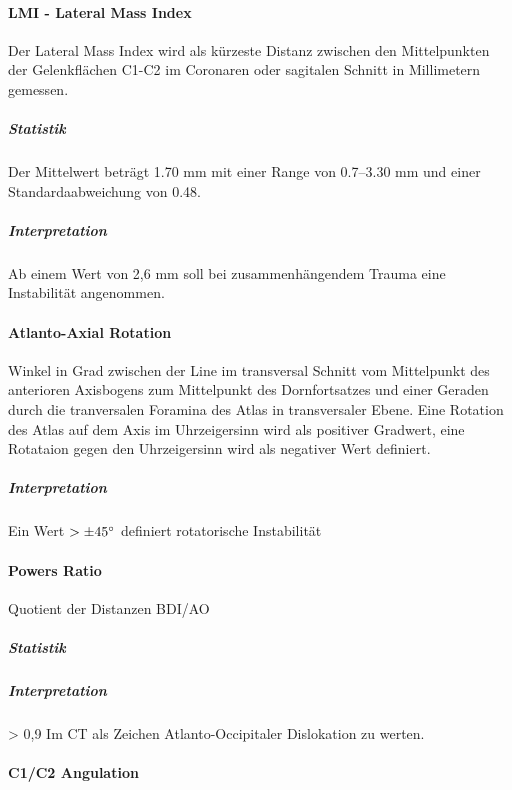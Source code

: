 \documentclass{report}
\begin{document}
\paragraph{LMI - Lateral Mass Index}

Der Lateral Mass Index wird als kürzeste Distanz zwischen den Mittelpunkten der Gelenkflächen C1-C2 im Coronaren oder sagitalen Schnitt in Millimetern gemessen. 
\subparagraph{Statistik}
Der Mittelwert beträgt 1.70 mm mit einer Range von 0.7–3.30 mm und einer Standardaabweichung von 0.48.
\subparagraph{Interpretation}
 Ab einem Wert von 2,6 mm soll bei zusammenhängendem Trauma eine Instabilität angenommen.

 


\paragraph{Atlanto-Axial Rotation} %
\label{par:c1_c2_rotation}
Winkel in Grad zwischen der Line im transversal Schnitt vom Mittelpunkt des anterioren Axisbogens zum Mittelpunkt des Dornfortsatzes und einer Geraden durch die tranversalen Foramina des Atlas in transversaler Ebene.
Eine Rotation des Atlas auf dem Axis im Uhrzeigersinn wird als positiver Gradwert, eine Rotataion gegen den Uhrzeigersinn wird als negativer Wert definiert.

\subparagraph{Interpretation}
 Ein Wert  $>\pm 45 \degree$ definiert rotatorische Instabilität
\paragraph{Powers Ratio} %
\label{par:powers_ratio}
Quotient der Distanzen BDI/AO

\subparagraph{Statistik}

\subparagraph{Interpretation} %
\label{subp:}
> 0,9 Im CT als Zeichen Atlanto-Occipitaler Dislokation zu werten.


\paragraph{C1/C2 Angulation} %
\label{par:c1_c2_angulation}

\paragraph{}


\end{document}
